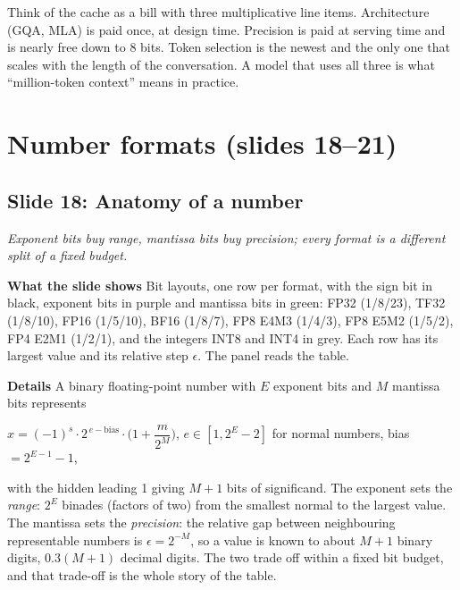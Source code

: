 \documentclass[11pt,letterpaper]{article}
\newcommand{\setstage}[1]{\colorlet{stagec}{#1}}
\newcommand{\slide}[3]{%
  \subsection[Slide #1: #2]{Slide #1: #2}%
  {\color{muted}\itshape #3\par}\medskip}
\newcommand{\para}[1]{\medskip\noindent\textbf{#1}\quad}
\newenvironment{intuition}{\begin{tcolorbox}[intuitionbox]}{\end{tcolorbox}}
\newenvironment{formulas}{\begin{tcolorbox}[formulabox]}{\end{tcolorbox}}
\begin{document}
\begin{intuition}
Think of the cache as a bill with three multiplicative line items. Architecture (GQA, MLA) is paid once, at design time. Precision is paid at serving time and is nearly free down to 8 bits. Token selection is the newest and the only one that scales with the length of the conversation. A model that uses all three is what ``million-token context'' means in practice.
\end{intuition}
\clearpage
\setstage{posc}
\section{Number formats (slides 18--21)}

\slide{18}{Anatomy of a number}{Exponent bits buy range, mantissa bits buy precision; every format is a different split of a fixed budget.}

\para{What the slide shows} Bit layouts, one row per format, with the sign bit in black, exponent bits in purple and mantissa bits in green: FP32 (1/8/23), TF32 (1/8/10), FP16 (1/5/10), BF16 (1/8/7), FP8 E4M3 (1/4/3), FP8 E5M2 (1/5/2), FP4 E2M1 (1/2/1), and the integers INT8 and INT4 in grey. Each row has its largest value and its relative step $\epsilon$. The panel reads the table.

\para{Details} A binary floating-point number with $E$ exponent bits and $M$ mantissa bits represents
\begin{formulas}
$x=(-1)^s\cdot2^{\,e-\text{bias}}\cdot\Big(1+\dfrac{m}{2^{M}}\Big)$, \quad $e\in[1,2^E-2]$ for normal numbers, \quad bias $=2^{E-1}-1$,
\end{formulas}
with the hidden leading 1 giving $M+1$ bits of significand. The exponent sets the \emph{range}: $2^E$ binades (factors of two) from the smallest normal to the largest value. The mantissa sets the \emph{precision}: the relative gap between neighbouring representable numbers is $\epsilon=2^{-M}$, so a value is known to about $M+1$ binary digits, $0.3(M+1)$ decimal digits. The two trade off within a fixed bit budget, and that trade-off is the whole story of the table.
\end{document}
